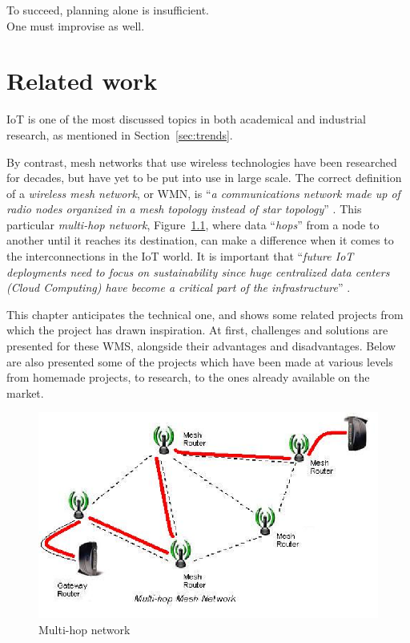 
\begin{savequote}[70mm]
	To succeed, planning alone is insufficient.\\
	One must improvise as well.
\end{savequote}

\chapter{Related work}\label{chapter:related_work}

	IoT is one of the most discussed topics in both academical and industrial research, as mentioned in Section~\ref{sec:trends}.
	
	By contrast, mesh networks that use wireless technologies have been researched for decades, but have yet to be put into use in large scale.
	The correct definition of a \textit{wireless mesh network}, or WMN, is ``\textit{a communications network made up of radio nodes organized in a mesh topology instead of star topology}'' \cite{wms}.	
	This particular \textit{multi-hop network}, Figure~\ref{img:multihop}, where data ``\textit{hops}'' from a node to another until it reaches its destination, can make a difference when it comes to the interconnections in the IoT world.
	It is important that ``\textit{future IoT deployments need to focus on sustainability since huge centralized data centers (Cloud Computing) have become a critical part of the infrastructure}'' \cite{7968828}.
	
	This chapter anticipates the technical one, and shows some related projects from which the project has drawn inspiration.
	At first, challenges and solutions are presented for these WMS, alongside their advantages and disadvantages.
	Below are also presented some of the projects which have been made at various levels from homemade projects, to research, to the ones already available on the market.
	
	\begin{figure}[h]
		\centering
		\includegraphics[width=\textwidth]{resources/img/chap4/mesh}
		\caption{Multi-hop network}
		\label{img:multihop}
	\end{figure}
	
